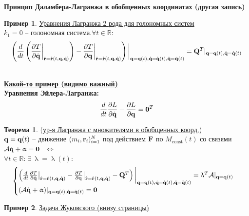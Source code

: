 \documentclass[specialist, subf, href, colorlinks=true, 12pt, times, mtpro, final]{disser}
\theoremstyle{definition}
\newtheorem{example}{Пример}[section]
\newtheorem{theorem}{Теорема}[section]
\def\note{\textcolor{faded}}
\def\const{\text{const}}
\def\bfrd{\dot{\bfr}}
\def\bfqd{\dot{\bfq}}
\def\bfqdd{\ddot{\bfq}}
\def\bfalpha{\upalpha}
\def\bfzero{\mathbf{0}}
\begin{document}
    \noindent\hyperlink{first_lects.16}{\bf Принцип Даламбера-Лагранжа в обобщенных координатах (другая запись)}
    \begin{example} \hyperlink{first_lects.16}{Уравнения Лагранжа 2 рода для голономных систем}\\
    $k_1 = 0$ -- голономная система.$\forall t\in\mathbb{R}$:\\
    $$\left(\frac{d}{dt}\left(\frac{\partial T}{\partial\bfqd}\bigg|_{\bfrd=\bfrd(t,\bfq,\bfqd)}\right) - \frac{\partial T}{\partial\bfq}\bigg|_{\bfrd=\bfrd(t,\bfq,\bfqd)}\right)\bigg|_{\bfq=\bfq(t),\bfqd=\bfqd(t),\bfqdd=\bfqdd(t)} = \bfQ^T|_{\bfq=\bfq(t),\bfqd=\bfqd(t)}$$
    \end{example}
    \\
    \noindent\hyperlink{first_lects.17}{\bf Какой-то пример \note{(видимо важный)}}\\
    {\bf Уравнения Эйлера-Лагранжа:} $$\frac{d}{dt}\frac{\partial L}{\partial\bfqd} - \frac{\partial L}{\partial\bfq} = \bfzero^T$$
    \begin{theorem} (\hyperlink{first_lects.17}{ур-я Лагранжа с множителями в обобщенных коорд.})\\
    $\mathbf{q}=\mathbf{q}(t)$ -- движение $(m_i, \mathbf{r}_i)_{i=1}^N$ под действием $\mathbf{F}$ по
    $M_{\const}(t)$ со связями $\mathcal{A}\bfqd+\bfalpha=\bfzero\,\,$
    $\Longleftrightarrow$\\ $\forall t\in\mathbb{R}:\,\exists\,\uplambda=\uplambda(t):$
    $$
    \begin{cases}
    \left(\frac{d}{dt}\frac{\partial T}{\partial\bfqd}\big|_{\bfrd=\bfrd(t,\bfq,\bfqd)} - \frac{\partial T}{\partial\bfq}\big|_{\bfrd=\bfrd(t,\bfq,\bfqd)} - \bfQ^T\right)\bigg|_{\bfq=\bfq(t),\bfqd=\bfqd(t),\bfqdd=\bfqdd(t)} = \uplambda^T\mathcal{A}|_{\bfq=\bfq(t)}\\
    (\mathcal{A}\bfqd+\bfalpha)|_{\bfq=\bfq(t),\bfqd=\bfqd(t)} = \bfzero\\
    \end{cases}
    $$
    \end{theorem}
    \begin{example}\hyperlink{first_lects.17}{Задача Жуковского (внизу страницы)}
    \end{example}
    
\end{document}
